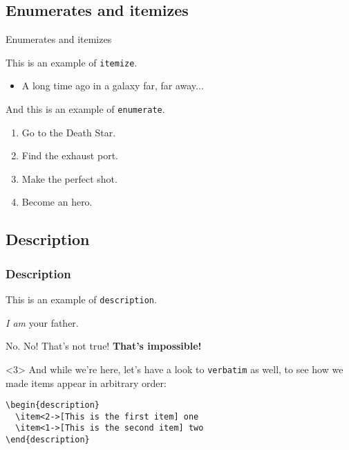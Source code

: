 \documentclass[usenames,dvipsnames]{beamer}
\begin{document}
\subsection{Enumerates and itemizes}

\begin{frame}{Enumerates and itemizes}

This is an example of \texttt{itemize}.
\begin{itemize}
	\item A long time ago in a galaxy far, far away...
\end{itemize}
And this is an example of \texttt{enumerate}.

\begin{enumerate}
  \item Go to the Death Star.
  \item Find the exhaust port.
  \item Make the perfect shot.
  \item Become an hero.
\end{enumerate}
\end{frame}

\subsection{Description}

\begin{frame}[fragile]
\frametitle{Description}
This is an example of \texttt{description}.

\begin{description}
\item<2->[Vader] \emph{I am} your father.
\item<1->[Luke] No. No! That's not true! \textbf{That's impossible!}
\end{description}

\begin{uncoverenv}<3>
  \vskip 0.5cm
  And while we're here, let's have a look to \texttt{verbatim} as well, to see how we made items appear in arbitrary order:
  \vskip 0.5cm
  \begin{verbatim}
\begin{description}
  \item<2->[This is the first item] one
  \item<1->[This is the second item] two
\end{description}
  \end{verbatim}
\end{uncoverenv}

\end{frame}
\end{document}
